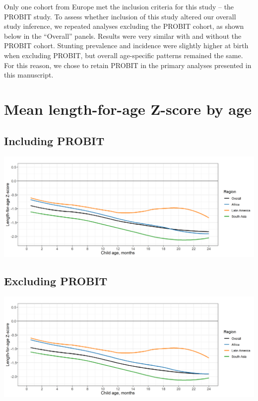 \documentclass[9pt,]{book}
\begin{document}
Only one cohort from Europe met the inclusion criteria for this study -- the PROBIT study. To assess whether inclusion of this study altered our overall study inference, we repeated analyses excluding the PROBIT cohort, as shown below in the ``Overall'' panels. Results were very similar with and without the PROBIT cohort. Stunting prevalence and incidence were slightly higher at birth when excluding PROBIT, but overall age-specific patterns remained the same. For this reason, we chose to retain PROBIT in the primary analyses presented in this manuscript.

\hypertarget{mean-length-for-age-z-score-by-age-1}{%
\section{Mean length-for-age Z-score by age}\label{mean-length-for-age-z-score-by-age-1}}

\hypertarget{including-probit}{%
\subsection{Including PROBIT}\label{including-probit}}

\includegraphics[width=41.67in]{figure-copies/fig-laz-2-mean-overall_region--allage-primary}

\hypertarget{excluding-probit}{%
\subsection{Excluding PROBIT}\label{excluding-probit}}

\includegraphics[width=41.67in]{figure-copies/fig-laz-2-mean-overall_region--allage-primary_no_probit}
\end{document}
